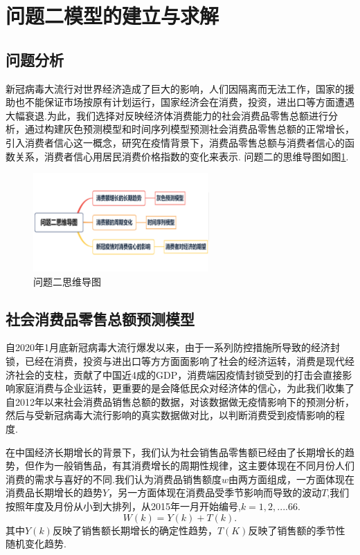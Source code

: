 \documentclass{whutmod}
\begin{document}
	\section{问题二模型的建立与求解}
	\subsection{问题分析}
	新冠病毒大流行对世界经济造成了巨大的影响，人们因隔离而无法工作，国家的援助也不能保证市场按原有计划运行，国家经济会在消费，投资，进出口等方面遭遇大幅衰退.为此，我们选择对反映经济体消费能力的社会消费品零售总额进行分析，通过构建灰色预测模型和时间序列模型预测社会消费品零售总额的正常增长，引入消费者信心这一概念，研究在疫情背景下，消费品零售总额与消费者信心的函数关系，消费者信心用居民消费价格指数的变化来表示.
	问题二的思维导图如图\ref{mindmap2}.
	\begin{figure}[!htbp]
		\centering
		\includegraphics[width=0.6\textwidth]{mindmap2.png}
		\caption{问题二思维导图}
		\label{mindmap2}
	\end{figure} 
	
	
	\subsection{社会消费品零售总额预测模型}
	自2020年1月底新冠病毒大流行爆发以来，由于一系列防控措施所导致的经济封锁，已经在消费，投资与进出口等方方面面影响了社会的经济运转，消费是现代经济社会的支柱，贡献了中国近4成的GDP，消费端因疫情封锁受到的打击会直接影响家庭消费与企业运转，更重要的是会降低民众对经济体的信心，为此我们收集了自2012年以来社会消费品销售总额的数据，对该数据做无疫情影响下的预测分析，然后与受新冠病毒大流行影响的真实数据做对比，以判断消费受到疫情影响的程度.
	
	在中国经济长期增长的背景下，我们认为社会销售品零售额已经由了长期增长的趋势，但作为一般销售品，有其消费增长的周期性规律，这主要体现在不同月份人们消费的需求与喜好的不同.我们认为消费品销售额度$w$由两方面组成，一方面体现在消费品长期增长的趋势$Y$，另一方面体现在消费品受季节影响而导致的波动$T$,我们按照年度及月份从小到大排列，从2015年一月开始编号,$k=1,2,....66$.
	\begin{equation}
	W(k)=Y(k)+T(k).
	\end{equation}
	其中$Y(k)$反映了销售额长期增长的确定性趋势，$T(K)$反映了销售额的季节性随机变化趋势.
	
\end{document}
